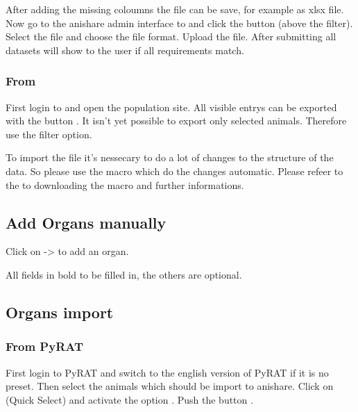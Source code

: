 \documentclass[letterpaper,10pt,openany,oneside,english]{sphinxmanual}
\begin{document}
After adding the missing coloumns the file can be save, for example as xlsx file. Now go to the anishare admin interface to 
and click the button  (above the filter). Select the file and choose the file format. Upload the file. After submitting all datasets will show to
the user if all requirements match.


\subsubsection{From }
\label{\detokenize{index:from-tick-lab}}
First login to  and open the population site. All visible entrys can be exported with the button . It isn’t yet possible to export
only selected animals. Therefore use the filter option.

\noindent{}

To import the file it’s nessecary to do a lot of changes to the structure of the data. So please use the macro which do the changes automatic.
Please refeer to the  to downloading the macro and further informations.


\subsection{Add Organs manually}
\label{\detokenize{index:add-organs-manually}}
Click on  -\textgreater{}  to add an organ.

\noindent{}

All fields in bold  to be filled in, the others are optional.


\subsection{Organs import}
\label{\detokenize{index:organs-import}}

\subsubsection{From PyRAT}
\label{\detokenize{index:id2}}
First login to PyRAT and switch to the english version of PyRAT if it is no preset. Then select the animals which
should be import to anishare. Click on  (Quick Select) and activate the option .
Push the button .
\end{document}
